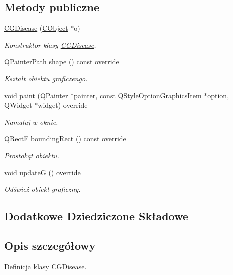 \subsection*{Metody publiczne}
\begin{DoxyCompactItemize}
\item 
\mbox{\hyperlink{class_c_g_disease_a68ecb36418f7c30caf62da33dfec4470}{C\+G\+Disease}} (\mbox{\hyperlink{class_c_object}{C\+Object}} $\ast$o)
\begin{DoxyCompactList}\small\item\em Konstruktor klasy \mbox{\hyperlink{class_c_g_disease}{C\+G\+Disease}}. \end{DoxyCompactList}\item 
Q\+Painter\+Path \mbox{\hyperlink{class_c_g_disease_a9cba2dd518ac5625a3982f6f92b3fd3f}{shape}} () const override
\begin{DoxyCompactList}\small\item\em Kształt obiektu graficzengo. \end{DoxyCompactList}\item 
void \mbox{\hyperlink{class_c_g_disease_a78fe4aba5b2efcbcd2a65555421bf359}{paint}} (Q\+Painter $\ast$painter, const Q\+Style\+Option\+Graphics\+Item $\ast$option, Q\+Widget $\ast$widget) override
\begin{DoxyCompactList}\small\item\em Namaluj w oknie. \end{DoxyCompactList}\item 
Q\+RectF \mbox{\hyperlink{class_c_g_disease_ab2652078d767e244b586577cbda52beb}{bounding\+Rect}} () const override
\begin{DoxyCompactList}\small\item\em Prostokąt obiektu. \end{DoxyCompactList}\item 
void \mbox{\hyperlink{class_c_g_disease_ab0399cfd8accefe5f049d66efb9539e4}{updateG}} () override
\begin{DoxyCompactList}\small\item\em Odśwież obiekt graficzny. \end{DoxyCompactList}\end{DoxyCompactItemize}
\subsection*{Dodatkowe Dziedziczone Składowe}


\subsection{Opis szczegółowy}
Definicja klasy \mbox{\hyperlink{class_c_g_disease}{C\+G\+Disease}}. 

